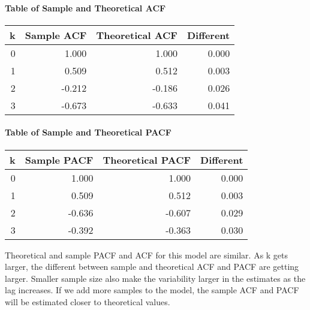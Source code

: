 \documentclass[
]{article}
\let\oldparagraph\paragraph
\renewcommand{\paragraph}[1]{\oldparagraph{#1}\mbox{}}
\begin{document}
\hypertarget{table-of-sample-and-theoretical-acf}{%
\paragraph{Table of Sample and Theoretical
ACF}\label{table-of-sample-and-theoretical-acf}}

\begin{table}[H]
\centering
\begin{tabular}{r|r|r|r}
\hline
k & Sample ACF & Theoretical ACF & Different\\
\hline
0 & 1.000 & 1.000 & 0.000\\
\hline
1 & 0.509 & 0.512 & 0.003\\
\hline
2 & -0.212 & -0.186 & 0.026\\
\hline
3 & -0.673 & -0.633 & 0.041\\
\hline
\end{tabular}
\end{table}

\hypertarget{table-of-sample-and-theoretical-pacf}{%
\paragraph{Table of Sample and Theoretical
PACF}\label{table-of-sample-and-theoretical-pacf}}

\begin{table}[H]
\centering
\begin{tabular}{r|r|r|r}
\hline
k & Sample PACF & Theoretical PACF & Different\\
\hline
0 & 1.000 & 1.000 & 0.000\\
\hline
1 & 0.509 & 0.512 & 0.003\\
\hline
2 & -0.636 & -0.607 & 0.029\\
\hline
3 & -0.392 & -0.363 & 0.030\\
\hline
\end{tabular}
\end{table}

Theoretical and sample PACF and ACF for this model are similar. As k
gets larger, the different between sample and theoretical ACF and PACF
are getting larger. Smaller sample size also make the variability larger
in the estimates as the lag increases. If we add more samples to the
model, the sample ACF and PACF will be estimated closer to theoretical
values.
\end{document}
